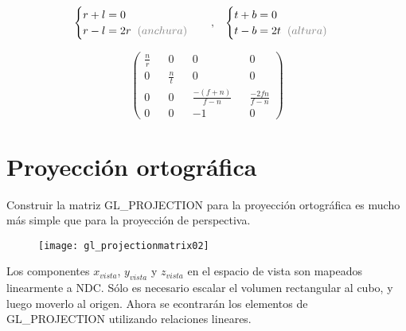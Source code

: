 \begin{equation*}
  \begin{cases}
    r+l = 0\\
    r-l = 2r \hspace*{0.2cm} \textcolor{gray}{(anchura)} \\
  \end{cases}
  \hspace*{0.3cm} , \hspace*{0.3cm}
  \begin{cases}
    t+b=0 \\
    t-b=2t \hspace*{0.2cm} \textcolor{gray}{(altura)} \\
  \end{cases}
\end{equation*}

\begin{figure} [h]
  \[
  \begin{pmatrix}
    \frac{n}{r} &&           0 &&                  0 &&                0 \\
              0 && \frac{n}{t} &&                  0 &&                0 \\
              0 &&           0 && \frac{-(f+n)}{f-n} && \frac{-2fn}{f-n} \\
              0 &&           0 &&                 -1 &&                0
  \end{pmatrix}
  \]
\end{figure}


\newpage


\section{Proyección ortográfica}
Construir la matriz GL\_PROJECTION para la proyección ortográfica es mucho más simple que para la proyección de perspectiva.

\begin{figure} [h]
  \centering
  \texttt{[image: gl\_projectionmatrix02]}
  \end{figure}

Los componentes $x_{vista}$, $y_{vista}$ y $z_{vista}$ en el espacio de vista son mapeados linearmente a NDC. Sólo es necesario escalar el volumen rectangular al cubo, y luego moverlo al origen. Ahora se econtrarán los elementos de GL\_PROJECTION utilizando relaciones lineares.

